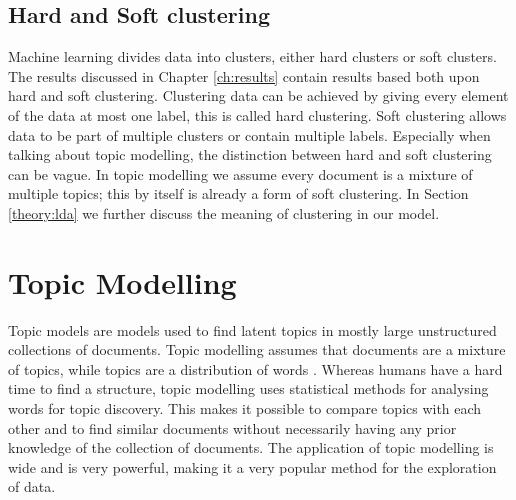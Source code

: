 \subsection{Hard and Soft clustering}
Machine learning divides data into clusters, either hard clusters or soft clusters. The results discussed in Chapter \ref{ch:results} contain results based both upon hard and soft clustering. Clustering data can be achieved by giving every element of the data at most one label, this is called hard clustering. Soft clustering allows data to be part of multiple clusters or contain multiple labels. Especially when talking about topic modelling, the distinction between hard and soft clustering can be vague. In topic modelling we assume every document is a mixture of multiple topics; this by itself is already a form of soft clustering. In Section \ref{theory:lda} we further discuss the meaning of clustering in our model.

\section{Topic Modelling}\label{theory:tm}
Topic models are models used to find latent topics in mostly large unstructured collections of documents. Topic modelling assumes that documents are a mixture of topics, while topics are a distribution of words \cite{Blei2010}. Whereas humans have a hard time to find a structure, topic modelling uses statistical methods for analysing words for topic discovery. This makes it possible to compare topics with each other and to find similar documents without necessarily having any prior knowledge of the collection of documents. The application of topic modelling is wide and is very powerful, making it a very popular method for the exploration of data. 



